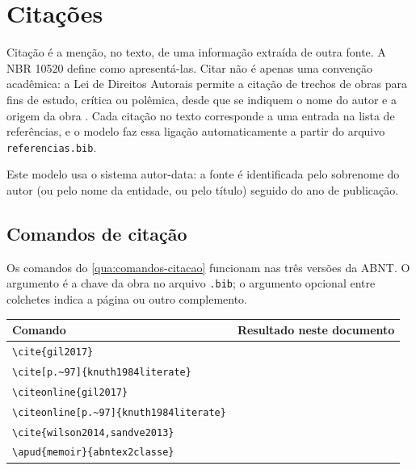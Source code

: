 \chapter{Citações}\label{cap:citacoes}

Citação é a menção, no texto, de uma informação extraída de outra fonte. A NBR 10520 \cite{abnt10520} define como apresentá-las. Citar não é apenas uma convenção acadêmica: a Lei de Direitos Autorais permite a citação de trechos de obras para fins de estudo, crítica ou polêmica, desde que se indiquem o nome do autor e a origem da obra \cite{brasil1998}. Cada citação no texto corresponde a uma entrada na lista de referências, e o modelo faz essa ligação automaticamente a partir do arquivo \texttt{referencias.bib}.

Este modelo usa o sistema autor-data: a fonte é identificada pelo sobrenome do autor (ou pelo nome da entidade, ou pelo título) seguido do ano de publicação.

\section{Comandos de citação}\label{sec:comandos-citacao}

Os comandos do \autoref{qua:comandos-citacao} funcionam nas três versões da ABNT. O argumento é a chave da obra no arquivo \texttt{.bib}; o argumento opcional entre colchetes indica a página ou outro complemento.

\begin{quadro}[htbp]
	\caption{Comandos de citação}\label{qua:comandos-citacao}
	\centering
	\footnotesize
	\begin{tabular}{p{}p{}}
		\toprule
		\textbf{Comando} & \textbf{Resultado neste documento} \\
		\midrule
		\verb|\cite{gil2017}| & \cite{gil2017} \\
		\verb|\cite[p.~97]{knuth1984literate}| & \cite[p.~97]{knuth1984literate} \\
		\verb|\citeonline{gil2017}| & \citeonline{gil2017} \\
		\verb|\citeonline[p.~97]{knuth1984literate}| & \citeonline[p.~97]{knuth1984literate} \\
		\verb|\cite{wilson2014,sandve2013}| & \cite{wilson2014,sandve2013} \\
		\verb|\apud{memoir}{abntex2classe}| & \apud{memoir}{abntex2classe} \\
		\bottomrule
	\end{tabular}
\end{quadro}

